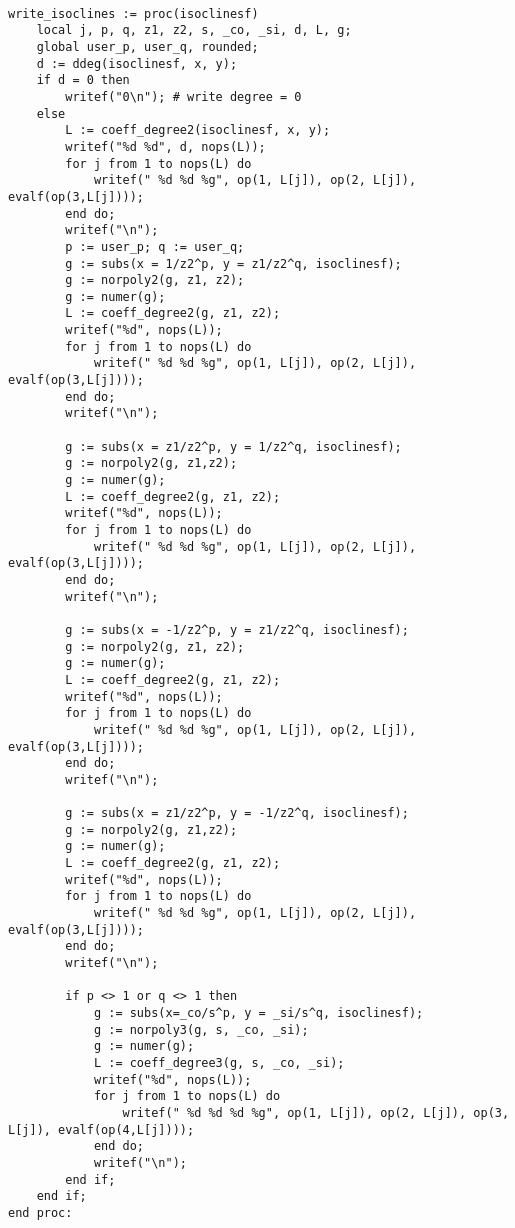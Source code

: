 \documentclass[a4paper,10pt]{article}
\begin{document}
\begin{lstlisting}[name=writelog3]

write_isoclines := proc(isoclinesf)
    local j, p, q, z1, z2, s, _co, _si, d, L, g;
    global user_p, user_q, rounded;
    d := ddeg(isoclinesf, x, y);
    if d = 0 then
        writef("0\n"); # write degree = 0
    else
        L := coeff_degree2(isoclinesf, x, y);
        writef("%d %d", d, nops(L));
        for j from 1 to nops(L) do
            writef(" %d %d %g", op(1, L[j]), op(2, L[j]), evalf(op(3,L[j])));
        end do;
        writef("\n");
        p := user_p; q := user_q;
        g := subs(x = 1/z2^p, y = z1/z2^q, isoclinesf);
        g := norpoly2(g, z1, z2);
        g := numer(g);
        L := coeff_degree2(g, z1, z2);
        writef("%d", nops(L));
        for j from 1 to nops(L) do
            writef(" %d %d %g", op(1, L[j]), op(2, L[j]), evalf(op(3,L[j])));
        end do;
        writef("\n");

        g := subs(x = z1/z2^p, y = 1/z2^q, isoclinesf);
        g := norpoly2(g, z1,z2);
        g := numer(g);
        L := coeff_degree2(g, z1, z2);
        writef("%d", nops(L));
        for j from 1 to nops(L) do
            writef(" %d %d %g", op(1, L[j]), op(2, L[j]), evalf(op(3,L[j])));
        end do;
        writef("\n");

        g := subs(x = -1/z2^p, y = z1/z2^q, isoclinesf);
        g := norpoly2(g, z1, z2);
        g := numer(g);
        L := coeff_degree2(g, z1, z2);
        writef("%d", nops(L));
        for j from 1 to nops(L) do
            writef(" %d %d %g", op(1, L[j]), op(2, L[j]), evalf(op(3,L[j])));
        end do;
        writef("\n");

        g := subs(x = z1/z2^p, y = -1/z2^q, isoclinesf);
        g := norpoly2(g, z1,z2);
        g := numer(g);
        L := coeff_degree2(g, z1, z2);
        writef("%d", nops(L));
        for j from 1 to nops(L) do
            writef(" %d %d %g", op(1, L[j]), op(2, L[j]), evalf(op(3,L[j])));
        end do;
        writef("\n");

        if p <> 1 or q <> 1 then
            g := subs(x=_co/s^p, y = _si/s^q, isoclinesf);
            g := norpoly3(g, s, _co, _si);
            g := numer(g);
            L := coeff_degree3(g, s, _co, _si);
            writef("%d", nops(L));
            for j from 1 to nops(L) do
                writef(" %d %d %d %g", op(1, L[j]), op(2, L[j]), op(3, L[j]), evalf(op(4,L[j])));
            end do;
            writef("\n");
        end if;
    end if;
end proc:
\end{lstlisting}
\end{document}
